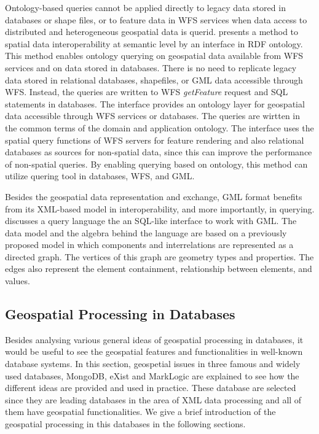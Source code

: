 \documentclass[a4paper,12pt]{article}
\begin{document}
Ontology-based queries cannot be applied directly to legacy data stored in databases or shape ﬁles, 
or to feature data in WFS services when data access to distributed and heterogeneous geospatial data is querid. 
\cite{Zhao2008} presents a method to spatial data interoperability at semantic level by an interface in RDF ontology. This method enables ontology querying on geospatial data available from WFS services and on data stored in databases. There is no need to replicate legacy data stored in relational databases, shapefiles, or GML data accessible through WFS. Instead, the queries are written to WFS \textit{getFeature} request and SQL statements in databases. The interface provides an ontology layer for geospatial data accessible through WFS services or databases. The queries are wirtten in the common terms of the domain and application ontology. The interface uses the spatial query functions of WFS servers for feature rendering and also relational databases as sources for non-spatial data, since this can improve the performance of non-spatial queries. By enabling querying based on ontology, this method can utilize quering tool in databases, WFS, and GML. 

Besides the geospatial data representation and exchange, GML format benefits from its XML-based model in interoperability, 
and more importantly, in querying. 
\cite{corcoles2001} discusses a query language the an SQL-like interface to work with GML. 
The data model and the algebra behind the language are based on a previously proposed model 
in which components and interrelations are represented as a directed graph. 
The vertices of this graph are geometry types and properties. The edges also represent the element containment, relationship between elements, and values. 


\subsection{Geospatial Processing in Databases} 
\label{s.dbs}
Besides analysing various general ideas of geospatial processing in databases, it would be useful to see the geospatial features and functionalities in well-known database systems. In this section, geospetial issues in three famous and widely used databases, MongoDB, eXist and MarkLogic are explained to see how the different ideas are provided and used in practice. 
These database are selected since they are leading databases in the area of XML data processing and
all of them have geospatial functionalities. We give a brief introduction of the geospatial processing in
this databases in the following sections.
\end{document}

